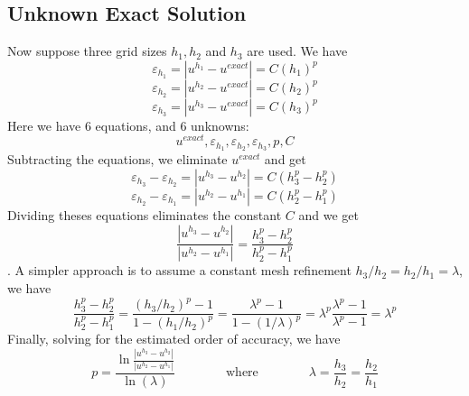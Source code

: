 \documentclass[11pt]{article}
\begin{document}
\subsection{Unknown Exact Solution}
Now suppose three grid sizes $h_1,h_2$ and $h_3$ are used. We have
\begin{equation}
	\varepsilon_{h_1} = |u^{h_1} - u^{exact}| = C (h_1)^p
\end{equation}
\begin{equation}
	\varepsilon_{h_2} = |u^{h_2} - u^{exact}| = C (h_2)^p
\end{equation}
\begin{equation}
	\varepsilon_{h_3} = |u^{h_3} - u^{exact}| = C (h_3)^p
\end{equation}
Here we have 6 equations, and 6 unknowns:
\begin{equation}
	u^{exact},
	\varepsilon_{h_1} ,
	\varepsilon_{h_2} ,
	\varepsilon_{h_3} ,
	p ,
	C
\end{equation}
Subtracting the equations, we eliminate $u^{exact}$ and get
\begin{equation}
	\varepsilon_{h_3}
	-
	\varepsilon_{h_2}
	=
	|u^{h_3} - u^{h_2}|
	=
	C (h_3^p - h_2^p)
\end{equation}
\begin{equation}
	\varepsilon_{h_2}
	-
	\varepsilon_{h_1}
	=
	|u^{h_2} - u^{h_1}|
	=
	C (h_2^p - h_1^p)
\end{equation}
Dividing theses equations eliminates the constant $C$ and we get
\begin{equation}
	\boxed{
	\frac{|u^{h_3} - u^{h_2}|}
	     {|u^{h_2} - u^{h_1}|}
	=
	\frac{h_3^p - h_2^p}{h_2^p - h_1^p}
	}
\end{equation}
. A simpler approach is to assume a constant mesh refinement $h_3/h_2 = h_2/h_1 = \lambda$, we have
\begin{equation}
	\frac{h_3^p - h_2^p}{h_2^p - h_1^p}
	=
	\frac{(h_3/h_2)^p - 1}{1 - (h_1/h_2)^p}
	=
	\frac{\lambda^p - 1}{1 - (1/\lambda)^p}
	=
	\lambda^p
	\frac{\lambda^p - 1}{\lambda^p - 1}
	=
	\lambda^p
\end{equation}
Finally, solving for the estimated order of accuracy, we have
\begin{equation}
	\boxed{
	p =
	\frac{\ln{\frac{|u^{h_3} - u^{h_2}|}
	     {|u^{h_2} - u^{h_1}|}}}{\ln(\lambda)}
	     }
     \qquad \qquad
     \text{where}
     \qquad \qquad
	\boxed{
	\lambda
	=
	\frac{h_3}{h_2}
	=
	\frac{h_2}{h_1}
	}
\end{equation}
\end{document}
